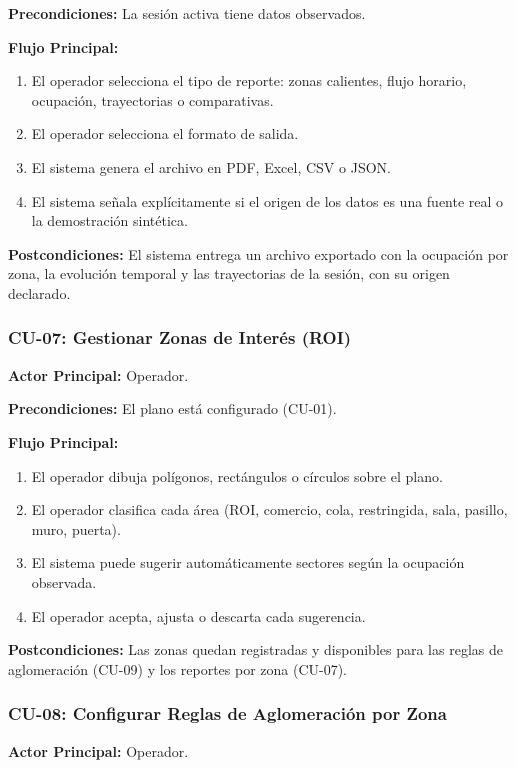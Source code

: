 \textbf{Precondiciones:} La sesión activa tiene datos observados.

\textbf{Flujo Principal:}
\begin{enumerate}
  \item El operador selecciona el tipo de reporte: zonas calientes, flujo horario, ocupación,
  trayectorias o comparativas.
  \item El operador selecciona el formato de salida.
  \item El sistema genera el archivo en PDF, Excel, CSV o JSON.
  \item El sistema señala explícitamente si el origen de los datos es una fuente real o la
  demostración sintética.
\end{enumerate}

\textbf{Postcondiciones:} El sistema entrega un archivo exportado con la ocupación por
zona, la evolución temporal y las trayectorias de la sesión, con su origen declarado.


\subsubsection{CU-07: Gestionar Zonas de Interés (ROI)}
\textbf{Actor Principal:} Operador.

\textbf{Precondiciones:} El plano está configurado (CU-01).

\textbf{Flujo Principal:}
\begin{enumerate}
  \item El operador dibuja polígonos, rectángulos o círculos sobre el plano.
  \item El operador clasifica cada área (ROI, comercio, cola, restringida, sala, pasillo, muro,
  puerta).
  \item El sistema puede sugerir automáticamente sectores según la ocupación observada.
  \item El operador acepta, ajusta o descarta cada sugerencia.
\end{enumerate}

\textbf{Postcondiciones:} Las zonas quedan registradas y disponibles para las reglas de
aglomeración (CU-09) y los reportes por zona (CU-07).


\subsubsection{CU-08: Configurar Reglas de Aglomeración por Zona}
\textbf{Actor Principal:} Operador.

